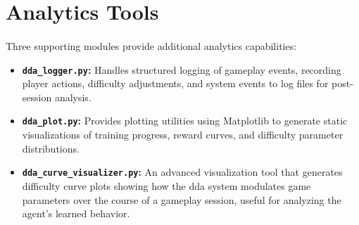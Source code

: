 \section{Analytics Tools}
\paragraph{} Three supporting modules provide additional analytics capabilities:

\begin{itemize}
	\item \textbf{\texttt{dda\_logger.py}:} Handles structured logging of gameplay events, recording player actions, difficulty adjustments, and system events to log files for post-session analysis.
	\item \textbf{\texttt{dda\_plot.py}:} Provides plotting utilities using Matplotlib to generate static visualizations of training progress, reward curves, and difficulty parameter distributions.
	\item \textbf{\texttt{dda\_curve\_visualizer.py}:} An advanced visualization tool that generates difficulty curve plots showing how the \ac{dda} system modulates game parameters over the course of a gameplay session, useful for analyzing the agent's learned behavior.
\end{itemize}
